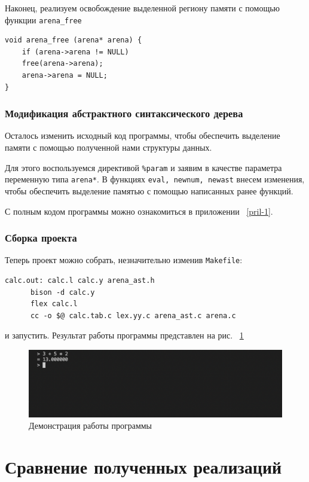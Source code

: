 \documentclass[bachelor, och, coursework]{SCWorks}
\begin{document}
Наконец, реализуем освобождение выделенной региону памяти с помощью 
функции \verb"arena_free"

\begin{verbatim}
void arena_free (arena* arena) {
	if (arena->arena != NULL)
	free(arena->arena);
	arena->arena = NULL;
}
\end{verbatim}

\subsubsection{Модификация абстрактного синтаксического дерева}

Осталось изменить исходный код программы, чтобы обеспечить выделение 
памяти с помощью полученной нами структуры данных.

Для этого воспользуемся директивой  \verb"%param" и заявим в качестве параметра 
переменную типа \verb"arena*". В функциях \verb"eval, newnum, newast" внесем 
изменения, чтобы обеспечить выделение памятью с помощью написанных ранее
функций.

С полным кодом программы можно ознакомиться в приложении ~\ref{pril-1}.

\subsubsection{Сборка проекта}

Теперь проект можно собрать, незначительно изменив \verb"Makefile":

\begin{verbatim}
calc.out: calc.l calc.y arena_ast.h
	  bison -d calc.y
	  flex calc.l
	  cc -o $@ calc.tab.c lex.yy.c arena_ast.c arena.c
\end{verbatim}
и запустить. Результат работы программы представлен на рис. ~\ref{net1}

\begin{figure}[!ht]
	\centering
	\includegraphics[width=12cm]{naivetest}
	\caption{Демонстрация работы программы}\label{net1}
\end{figure}

\newpage
\section{Сравнение полученных реализаций}
\end{document}
